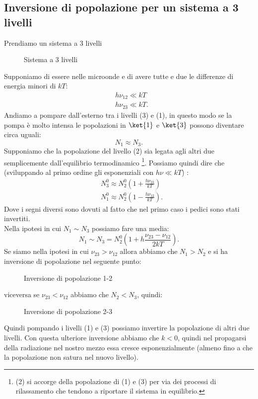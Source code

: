 \subsection{Inversione di popolazione per un sistema a 3 livelli}%
Prendiamo un sistema a 3 livelli
\begin{figure}[ht]
    \centering
    \caption{Sistema a 3 livelli}
    \label{fig:sistema-a-3-livelli}
\end{figure}
Supponiamo di essere nelle microonde e di avere tutte e due le differenze di energia minori di $kT$:
\[\begin{aligned}
    &h\nu_{12}\ll kT\\
    &h\nu_{23}\ll kT
.\end{aligned}\] 
Andiamo a pompare dall'esterno tra i livelli (3) e (1), in questo modo se la pompa è molto intensa le popolazioni in $\ket{1}$ e $\ket{3}$ possono diventare circa uguali:
\[
    N_1\approx N_3
.\] 
Supponiamo che la popolazione del livello (2) sia legata agli altri due semplicemente dall'equilibrio termodinamico 
\footnote{(2) si accorge della popolazione di (1) e (3) per via dei processi di rilassamento che tendono a riportare il sistema in equilibrio.}.
Possiamo quindi dire che (sviluppando al primo ordine gli esponenziali con $h\nu\ll kT$) :
\[\begin{aligned}
    &N_3^0 
    \approx N_2^0\left(1+ \frac{h\nu_{23}}{kT}\right)\\
    &N_1^0 
    \approx N_2^0\left(1-\frac{h\nu_{12}}{kT}\right)
.\end{aligned}\]
Dove i segni diversi sono dovuti al fatto che nel primo caso i pedici sono stati invertiti.\\
Nella ipotesi in cui $N_1\sim N_3$ possiamo fare una media:
\[
    N_1\sim N_3 = N_2^0\left(1+ h \frac{\nu_{23}-\nu_{12}}{2kT}\right)
.\] 
Se siamo nella ipotesi in cui $\nu_{23}>\nu_{12}$ allora abbiamo che $N_1>N_2$ e si ha inversione di popolazione nel seguente punto:
\begin{figure}[H]
    \centering
    \caption{Inversione di popolazione 1-2}
    \label{fig:inversione-di-popolazione-1-2}
\end{figure}
\noindent
viceversa se $\nu_{23}<\nu_{12}$ abbiamo che $N_2<N_3$, quindi:
\begin{figure}[H]
    \centering
    \caption{Inversione di popolazione 2-3}
    \label{fig:inversione-di-popolazione-2-3}
\end{figure}
\noindent
Quindi pompando i livelli (1) e (3) possiamo invertire la popolazione di altri due livelli. 
Con questa ulteriore inversione abbiamo che $k<0$, quindi nel propagarsi della radiazione nel nostro mezzo essa cresce esponenzialmente (almeno fino a che la popolazione non satura nel nuovo livello).
